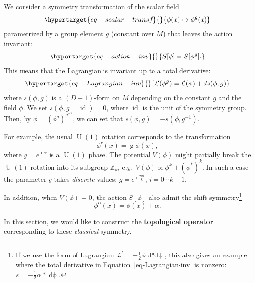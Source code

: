 \documentclass[
  letterpaper,
  DIV=11,
  numbers=noendperiod]{scrreport}
\DeclareMathOperator{\U}{U}
\DeclareMathOperator{\imunit}{i}
\DeclareMathOperator{\id}{id}
\newcommand{\stdim}{D}
\begin{document}
We consider a symmetry transformation of the scalar field
\begin{equation}\protect\hypertarget{eq-scalar-transf}{}{
\phi(x) \mapsto \phi^g(x)
}\label{eq-scalar-transf}\end{equation} parametrized by a group element
\(g\) (constant over \(M\)) that leaves the action invariant:
\begin{equation}\protect\hypertarget{eq-action-inv}{}{
S[\phi]=S[\phi^g].
}\label{eq-action-inv}\end{equation} This means that the Lagrangian is
invariant up to a total derivative:
\begin{equation}\protect\hypertarget{eq-Lagrangian-inv}{}{
\mathcal{L}(\phi^g) = \mathcal{L}(\phi) + \mathop{ds}(\phi,g) 
}\label{eq-Lagrangian-inv}\end{equation} where \(s(\phi,g)\) is a
\((\stdim-1)\)-form on \(M\) depending on the constant \(g\) and the
field \(\phi\). We set \(s(\phi,g=\id) = 0\), where \(\id\) is the unit
of the symmetry group. Then, by \(\phi = (\phi^g)^{g^{-1}}\), we can set
that \(s(\phi,g) = - s(\phi,g^{-1})\).

For example, the usual \(\U(1)\) rotation corresponds to the
transformation \[
\phi^g(x) = \mathop{g} \phi(x),
\] where \(g=e^{\imunit \alpha}\) is a \(\U(1)\) phase. The potential
\(V(\phi)\) might partially break the \(\U(1)\) rotation into its
subgroup \(\mathbb{Z}_k\), e.g.~\(V(\phi)\propto \phi^k+(\phi^*)^k\). In
such a case the parameter \(g\) takes \emph{discrete} values:
\(g = e^{\imunit \frac{2\pi i}{k}}\), \(i= 0 \cdots k-1\).

In addition, when \(V(\phi)=0\), the action \(S[\phi]\) also admit the
shift symmetry\footnote{If we use the form of Lagrangian
  \(\mathcal{L}^\prime= -\frac12 \phi \mathop{d*d\phi}\), this also
  gives an example where the total derivative in
  Equation~\ref{eq-Lagrangian-inv} is nonzero:
  \(s=-\frac12 \alpha \mathop{*}\mathop{d\phi}\).} \[
\phi^{\alpha}(x) = \phi(x) + \alpha.
\]

In this section, we would like to construct the \textbf{topological
operator} corresponding to these \emph{classical} symmetry.
\end{document}
